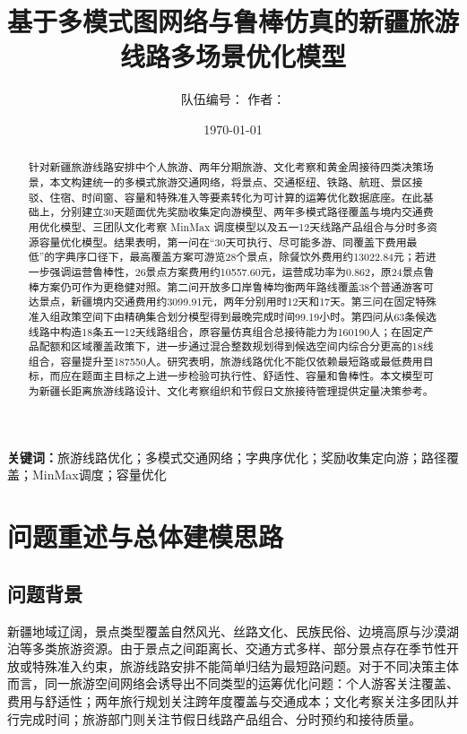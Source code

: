 \documentclass[UTF8,zihao=-4,a4paper]{ctexart}
\title{\zihao{2}\bfseries 基于多模式图网络与鲁棒仿真的新疆旅游线路多场景优化模型}
\author{\zihao{-4} 队伍编号：\underline{\hspace{4cm}} \quad 作者：\underline{\hspace{5cm}}}
\date{\zihao{-4}\today}
\begin{document}
\maketitle

\begin{abstract}
针对新疆旅游线路安排中个人旅游、两年分期旅游、文化考察和黄金周接待四类决策场景，本文构建统一的多模式旅游交通网络，将景点、交通枢纽、铁路、航班、景区接驳、住宿、时间窗、容量和特殊准入等要素转化为可计算的运筹优化数据底座。在此基础上，分别建立30天题面优先奖励收集定向游模型、两年多模式路径覆盖与境内交通费用优化模型、三团队文化考察 MinMax 调度模型以及五一12天线路产品组合与分时多资源容量优化模型。结果表明，第一问在“30天可执行、尽可能多游、同覆盖下费用最低”的字典序口径下，最高覆盖方案可游览28个景点，除餐饮外费用约13022.84元；若进一步强调运营鲁棒性，26景点方案费用约10557.60元，运营成功率为0.862，原24景点鲁棒方案仍可作为更稳健对照。第二问开放多口岸鲁棒均衡两年路线覆盖38个普通游客可达景点，新疆境内交通费用约3099.91元，两年分别用时12天和17天。第三问在固定特殊准入组政策空间下由精确集合划分模型得到最晚完成时间99.19小时。第四问从63条候选线路中构造18条五一12天线路组合，原容量仿真组合总接待能力为160190人；在固定产品配额和区域覆盖政策下，进一步通过混合整数规划得到候选空间内综合分更高的18线组合，容量提升至187550人。研究表明，旅游线路优化不能仅依赖最短路或最低费用目标，而应在题面主目标之上进一步检验可执行性、舒适性、容量和鲁棒性。本文模型可为新疆长距离旅游线路设计、文化考察组织和节假日文旅接待管理提供定量决策参考。
\end{abstract}

\noindent\textbf{关键词：}旅游线路优化；多模式交通网络；字典序优化；奖励收集定向游；路径覆盖；MinMax调度；容量优化

\newpage
\tableofcontents
\newpage

\section{问题重述与总体建模思路}

\subsection{问题背景}
新疆地域辽阔，景点类型覆盖自然风光、丝路文化、民族民俗、边境高原与沙漠湖泊等多类旅游资源。由于景点之间距离长、交通方式多样、部分景点存在季节性开放或特殊准入约束，旅游线路安排不能简单归结为最短路问题。对于不同决策主体而言，同一旅游空间网络会诱导出不同类型的运筹优化问题：个人游客关注覆盖、费用与舒适性；两年旅行规划关注跨年度覆盖与交通成本；文化考察关注多团队并行完成时间；旅游部门则关注节假日线路产品组合、分时预约和接待质量。
\end{document}
